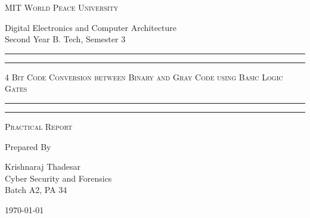 \documentclass[11pt]{article}
\begin{document}
\begin{titlepage}
	\centering


	\huge\textsc{
		MIT World Peace University
	}\\

	\vspace{0.75\baselineskip} %

	\LARGE{
		Digital Electronics and Computer Architecture\\
		Second Year B. Tech, Semester 3
	}

	\vfill %


	\rule{\textwidth}{1.6pt}\vspace*{-\baselineskip}\vspace*{2pt}
	\rule{\textwidth}{0.6pt}
	\vspace{0.75\baselineskip} %



	\huge{\textsc{
			4 Bit Code Conversion between Binary and Gray Code using Basic Logic Gates
		}} \\



	\vspace{0.5\baselineskip} %
	\rule{\textwidth}{0.6pt}\vspace*{-\baselineskip}\vspace*{2.8pt}
	\rule{\textwidth}{1.6pt}

	\vspace{1\baselineskip} %


	\LARGE\textsc{
		Practical Report
	} %
	\vfill


	Prepared By
	\vspace{0.5\baselineskip} %

	\Large{
		Krishnaraj Thadesar \\
		Cyber Security and Forensics\\
		Batch A2, PA 34
	}


	\vspace{0.5\baselineskip} %
	\today

\end{titlepage}
\end{document}
